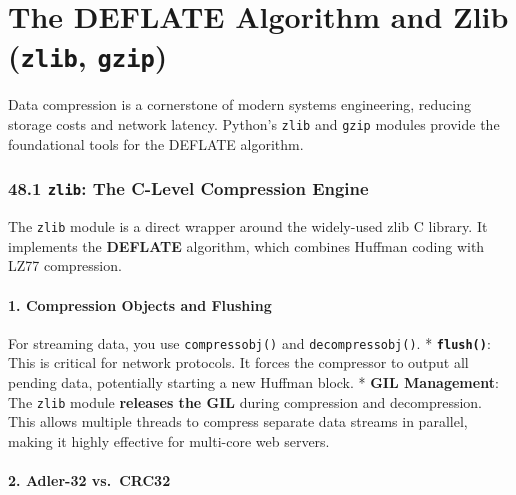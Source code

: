 \hypertarget{the-deflate-algorithm-and-zlib-zlib-gzip}{%
\chapter{\texorpdfstring{The DEFLATE Algorithm and Zlib (\texttt{zlib},
\texttt{gzip})}{The DEFLATE Algorithm and Zlib (zlib, gzip)}}\label{the-deflate-algorithm-and-zlib-zlib-gzip}}

Data compression is a cornerstone of modern systems engineering,
reducing storage costs and network latency. Python's
\passthrough{\lstinline!zlib!} and \passthrough{\lstinline!gzip!}
modules provide the foundational tools for the DEFLATE algorithm.

\hypertarget{zlib-the-c-level-compression-engine}{%
\subsection{\texorpdfstring{48.1 \texttt{zlib}: The C-Level Compression
Engine}{48.1 zlib: The C-Level Compression Engine}}\label{zlib-the-c-level-compression-engine}}

The \passthrough{\lstinline!zlib!} module is a direct wrapper around the
widely-used zlib C library. It implements the \textbf{DEFLATE}
algorithm, which combines Huffman coding with LZ77 compression.

\hypertarget{compression-objects-and-flushing}{%
\subsubsection{1. Compression Objects and
Flushing}\label{compression-objects-and-flushing}}

For streaming data, you use \passthrough{\lstinline!compressobj()!} and
\passthrough{\lstinline!decompressobj()!}. *
\textbf{\passthrough{\lstinline!flush()!}}: This is critical for network
protocols. It forces the compressor to output all pending data,
potentially starting a new Huffman block. * \textbf{GIL Management}: The
\passthrough{\lstinline!zlib!} module \textbf{releases the GIL} during
compression and decompression. This allows multiple threads to compress
separate data streams in parallel, making it highly effective for
multi-core web servers.

\hypertarget{adler-32-vs.-crc32}{%
\subsubsection{2. Adler-32 vs.~CRC32}\label{adler-32-vs.-crc32}}

